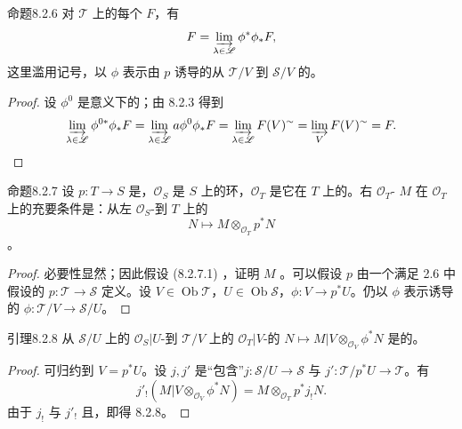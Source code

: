 \begin{SGAresult}{命题}{8.2.6}
对 $\mathscr T$ 上的每个 $F$，有
\[F=\varinjlim_{\lambda\in\mathscr L}\phi^*\phi_*F,\]
这里滥用记号，以 $\phi$ 表示由 $p$ 诱导的从 $\mathscr T/V$ 到 $\mathscr S/V$ 的。
\end{SGAresult}
\begin{proof}
设 $\phi^0$ 是意义下的；由 8.2.3 得到
\[\varinjlim_{\lambda\in\mathscr L}\phi^{0*}\phi_*F
=\varinjlim_{\lambda\in\mathscr L}a\phi^0\phi_*F
=\varinjlim_{\lambda\in\mathscr L}F(V)^{\sim}
=\varinjlim_VF(V)^{\sim}=F.\]
\end{proof}
\begin{SGAresult}{命题}{8.2.7}
设 $p:T\to S$ 是，$\mathcal O_S$ 是 $S$ 上的环，$\mathcal O_T$ 是它在 $T$ 上的。右 $\mathcal O_T$- $M$ 在 $\mathcal O_T$ 上的充要条件是：从左 $\mathcal O_S$-到 $T$ 上的
\begin{equation}N\longmapsto M\otimes_{\mathcal O_T}p^*N\tag{8.2.7.1}\end{equation}
。
\end{SGAresult}
\begin{proof}
必要性显然；因此假设 (8.2.7.1) ，证明 $M$ 。可以假设 $p$ 由一个满足 2.6 中假设的 $p:\mathscr T\to\mathscr S$ 定义。设 $V\in\operatorname{Ob}\mathscr T$，$U\in\operatorname{Ob}\mathscr S$，$\phi:V\to p^*U$。仍以 $\phi$ 表示诱导的 $\phi:\mathscr T/V\to\mathscr S/U$。
\end{proof}
\begin{SGAresult}{引理}{8.2.8}
从 $\mathscr S/U$ 上的 $\mathcal O_S|U$-到 $\mathscr T/V$ 上的 $\mathcal O_T|V$-的 $N\mapsto M|V\otimes_{\mathcal O_V}\phi^*N$ 是的。
\end{SGAresult}
\begin{proof}
可归约到 $V=p^*U$。设 $j,j'$ 是“包含”$j:\mathscr S/U\to\mathscr S$ 与 $j':\mathscr T/p^*U\to\mathscr T$。有
\[j'_!(M|V\otimes_{\mathcal O_V}\phi^*N)=M\otimes_{\mathcal O_T}p^*j_!N.\]
由于 $j_!$ 与 $j'_!$ 且，即得 8.2.8。
\end{proof}
